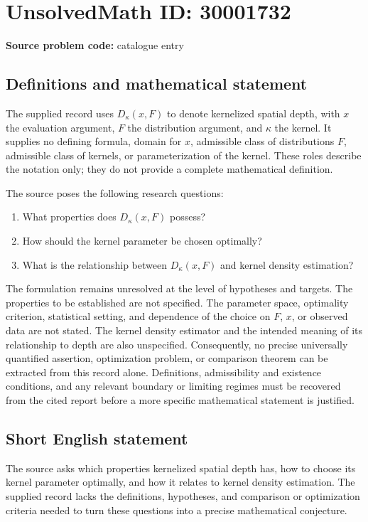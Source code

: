 \documentclass[11pt]{article}
\begin{document}
\section*{UnsolvedMath ID: 30001732}
\textbf{Source problem code:} catalogue entry
\subsection{Definitions and mathematical statement}
The supplied record uses \(D_\kappa(x,F)\) to denote kernelized spatial depth, with \(x\) the evaluation argument, \(F\) the distribution argument, and \(\kappa\) the kernel. It supplies no defining formula, domain for \(x\), admissible class of distributions \(F\), admissible class of kernels, or parameterization of the kernel. These roles describe the notation only; they do not provide a complete mathematical definition.

The source poses the following research questions:
\begin{enumerate}
\item What properties does \(D_\kappa(x,F)\) possess?
\item How should the kernel parameter be chosen optimally?
\item What is the relationship between \(D_\kappa(x,F)\) and kernel density estimation?
\end{enumerate}
The formulation remains unresolved at the level of hypotheses and targets. The properties to be established are not specified. The parameter space, optimality criterion, statistical setting, and dependence of the choice on \(F\), \(x\), or observed data are not stated. The kernel density estimator and the intended meaning of its relationship to depth are also unspecified. Consequently, no precise universally quantified assertion, optimization problem, or comparison theorem can be extracted from this record alone. Definitions, admissibility and existence conditions, and any relevant boundary or limiting regimes must be recovered from the cited report before a more specific mathematical statement is justified.
\subsection{Short English statement}
The source asks which properties kernelized spatial depth has, how to choose its kernel parameter optimally, and how it relates to kernel density estimation. The supplied record lacks the definitions, hypotheses, and comparison or optimization criteria needed to turn these questions into a precise mathematical conjecture.
\end{document}
